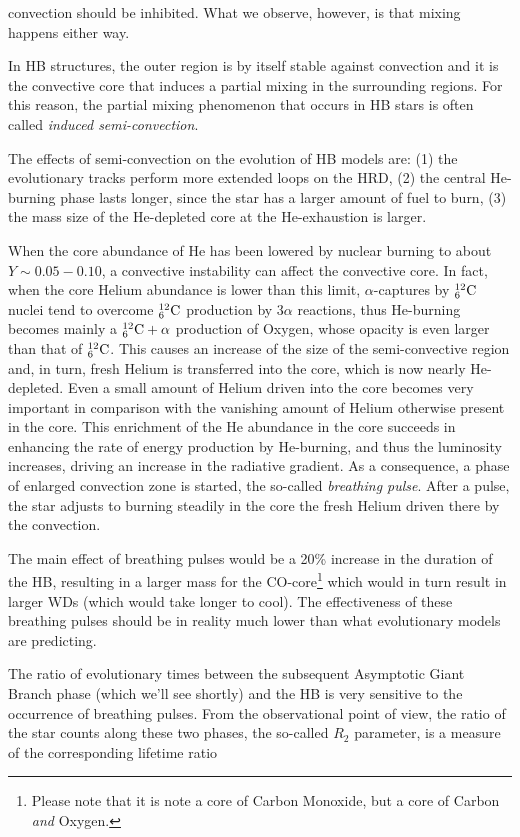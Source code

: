 convection should be inhibited. What we observe, however, is that mixing happens either way.
\par In HB structures, the outer region is by itself stable against convection and it is the convective core that induces a partial mixing in the surrounding regions. For this reason, the partial mixing phenomenon that occurs in HB stars is often called \emph{induced semi-convection}.
\par The effects of semi-convection on the evolution of HB models are: (1) the evolutionary tracks perform more extended loops on the HRD, (2) the central He-burning phase lasts longer, since the star has a larger amount of fuel to burn, (3) the mass size of the He-depleted core at the He-exhaustion is larger.
\par When the core abundance of He has been lowered by nuclear burning to about $Y \sim 0.05-0.10$, a convective instability can affect the convective core. In fact, when the core Helium abundance is lower than this limit, $\alpha$-captures by $\element{C}{12}{6}$ nuclei tend to overcome $\element{C}{12}{6}$ production by $3\alpha$ reactions, thus He-burning becomes mainly a $\element{C}{12}{6} + \alpha$ production of Oxygen, whose opacity is even larger than that of $\element{C}{12}{6}$. This causes an increase of the size of the semi-convective region and, in turn, fresh Helium is transferred into the core, which is now nearly He-depleted. Even a small amount of Helium driven into the core becomes very important in comparison with the vanishing amount of Helium otherwise present in the core. This enrichment of the He abundance in the core succeeds in enhancing the rate of energy production by He-burning, and thus the luminosity increases, driving an increase in the radiative gradient. As a consequence, a phase of enlarged convection zone is started, the so-called \emph{breathing pulse}. After a pulse, the star adjusts to burning steadily in the core the fresh Helium driven there by the convection.
\par The main effect of breathing pulses would be a 20\% increase in the duration of the HB, resulting in a larger mass for the CO-core\footnote{Please note that it is note a core of Carbon Monoxide, but a core of Carbon \emph{and} Oxygen.} which would in turn result in larger WDs (which would take longer to cool). The effectiveness of these breathing pulses should be in reality much lower than what evolutionary models are predicting.
\par The ratio of evolutionary times between the subsequent Asymptotic Giant Branch phase (which we'll see shortly) and the HB is very sensitive to the occurrence of breathing pulses. From the observational point of view, the ratio of the star counts along these two phases, the so-called $R_{2}$ parameter, is a measure of the corresponding lifetime ratio 
